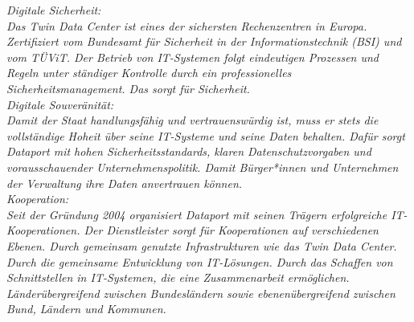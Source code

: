 \noindent
\em{Digitale Sicherheit:}\\
Das Twin Data Center ist eines der sichersten Rechenzentren in Europa. Zertifiziert vom Bundesamt für Sicherheit in der Informationstechnik (BSI) und vom TÜViT. Der Betrieb von IT-Systemen folgt eindeutigen Prozessen und Regeln unter ständiger Kontrolle durch ein professionelles Sicherheitsmanagement. Das sorgt für Sicherheit.\\
\em{Digitale Souveränität:}\\
Damit der Staat handlungsfähig und vertrauenswürdig ist, muss er stets die vollständige Hoheit über seine IT-Systeme und seine Daten behalten. Dafür sorgt Dataport mit hohen Sicherheitsstandards, klaren Datenschutzvorgaben und vorausschauender Unternehmenspolitik. Damit Bürger*innen und Unternehmen der Verwaltung ihre Daten anvertrauen können.\\
\em{Kooperation:}\\
Seit der Gründung 2004 organisiert Dataport mit seinen Trägern erfolgreiche IT-Kooperationen. Der Dienstleister sorgt für Kooperationen auf verschiedenen Ebenen. Durch gemeinsam genutzte Infrastrukturen wie das Twin Data Center. Durch die gemeinsame Entwicklung von IT-Lösungen. Durch das Schaffen von Schnittstellen in IT-Systemen, die eine Zusammenarbeit ermöglichen. Länderübergreifend zwischen Bundesländern sowie ebenenübergreifend zwischen Bund, Ländern und Kommunen.
